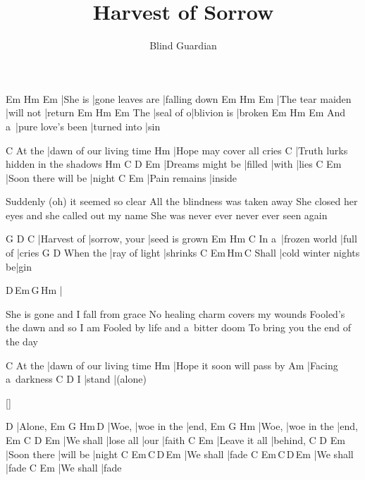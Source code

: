 \documentclass{song}
\title{Harvest of Sorrow}
\author{Blind Guardian}
\begin{document}
\begin{multicols}{2}

\strophe
Em\7    Hm               Em\7     
|She is |gone leaves are |falling down
Em\7             Hm        Em\7
|The tear maiden |will not |return
    Em\7      Hm          Em\7
The |seal of o|blivion is |broken
      Em\7              Hm           Em\7
And a~|pure love's been |turned into |sin
\endstrophe

\strophe
       C
At the |dawn of our living time
Hm
|Hope may cover all cries
C
|Truth lurks hidden in the shadows
Hm               C       D     Em
|Dreams might be |filled |with |lies
C                   Em
|Soon there will be |night
C             Em
|Pain remains |inside
\endstrophe

\strophe*
Suddenly (oh) it seemed so clear
All the blindness was taken away
She closed her eyes and she called out my name
She was never ever never ever seen again
\endstrophe

G           D             C
|Harvest of |sorrow, your |seed is grown
     Em            Hm       C
In a~|frozen world |full of |cries
         G             D
When the |ray of light |shrinks
      C                     Em\,Hm\,C
Shall |cold winter nights be|gin
\endstrophe

\strophe
D\,Em\,G\,Hm
|
\endstrophe

\columnbreak

\strophe*
She is gone and I fall from grace
No healing charm covers my wounds
Fooled's the dawn and so I am
Fooled by life and a~bitter doom
To bring you the end of the day
\endstrophe

\strophe
       C
At the |dawn of our living time
Hm
|Hope it soon will pass by
Am
|Facing a~darkness
  C      D
I |stand |(alone)
\endstrophe

\ref{}

\strophe
D
|Alone,
Em    G           Hm\,D
|Woe, |woe in the |end,
Em    G           Hm
|Woe, |woe in the |end,
Em        C         D    Em
|We shall |lose all |our |faith
C             Em
|Leave it all |behind,
C           D        Em
|Soon there |will be |night
C         Em\,C\,D\,Em
|We shall |fade
C         Em\,C\,D\,Em
|We shall |fade
C         Em
|We shall |fade
\endstrophe

\end{multicols}
\end{document}
